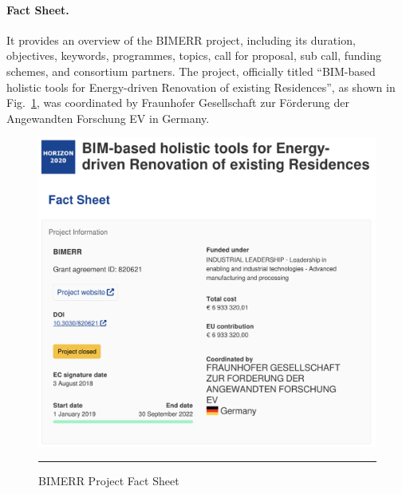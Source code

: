 \paragraph*{Fact Sheet.}
It provides an overview of the BIMERR project, including its duration, objectives, keywords, programmes, topics, call for proposal, sub call, funding schemes, and consortium partners.
The project, officially titled ``BIM-based holistic tools for Energy-driven Renovation of existing Residences'', as shown in Fig.~\ref{fig:bimerr-fact-sheet}, was coordinated by Fraunhofer Gesellschaft zur F\"orderung der Angewandten Forschung EV in Germany.

\begin{figure}[htbp]
    \centering
 \includegraphics[width=.75\textwidth]{figures/scenario-analysis/bimerr-fact-sheet.png}
     \rule{35em}{0.5pt}
    \caption{BIMERR Project Fact Sheet}
 \label{fig:bimerr-fact-sheet}
\end{figure}


